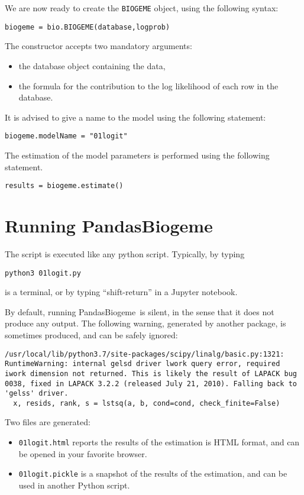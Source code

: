 \documentclass[12pt,a4paper]{article}
\newcommand{\PDBIOGEME}{PandasBiogeme}
\begin{document}
We are now ready to create the \lstinline+BIOGEME+ object, using the
following syntax:
\begin{lstlisting}
biogeme = bio.BIOGEME(database,logprob)
\end{lstlisting}
The constructor accepts two mandatory arguments:
\begin{itemize}
\item the database object containing the data,
\item the formula for the contribution to the log likelihood of each
  row in the database. 
\end{itemize}
It is advised to give a name to the model using the following
statement:
\begin{lstlisting}
biogeme.modelName = "01logit"
\end{lstlisting}

The estimation of the model parameters is performed using the
following statement. 

\begin{lstlisting}
results = biogeme.estimate()
\end{lstlisting}


\section{Running \PDBIOGEME}

The script is executed like any python script. Typically, by typing
\begin{lstlisting}
python3 01logit.py
\end{lstlisting}
is a terminal, or by typing ``shift-return'' in a Jupyter notebook.

By default, running \PDBIOGEME\ is silent, in the sense that it does
not produce any output. The following warning, generated by another
package, is sometimes produced, and can be safely ignored:
\begin{lstlisting}
/usr/local/lib/python3.7/site-packages/scipy/linalg/basic.py:1321: RuntimeWarning: internal gelsd driver lwork query error, required iwork dimension not returned. This is likely the result of LAPACK bug 0038, fixed in LAPACK 3.2.2 (released July 21, 2010). Falling back to 'gelss' driver.
  x, resids, rank, s = lstsq(a, b, cond=cond, check_finite=False)  
\end{lstlisting}

Two files are generated:
\begin{itemize}
\item \lstinline+01logit.html+ reports the results of the estimation
  is HTML format, and can be opened in your favorite browser. 
\item \lstinline+01logit.pickle+ is a snapshot of the results of the
estimation, and can be used in another Python script. 
\end{itemize}
\end{document}

